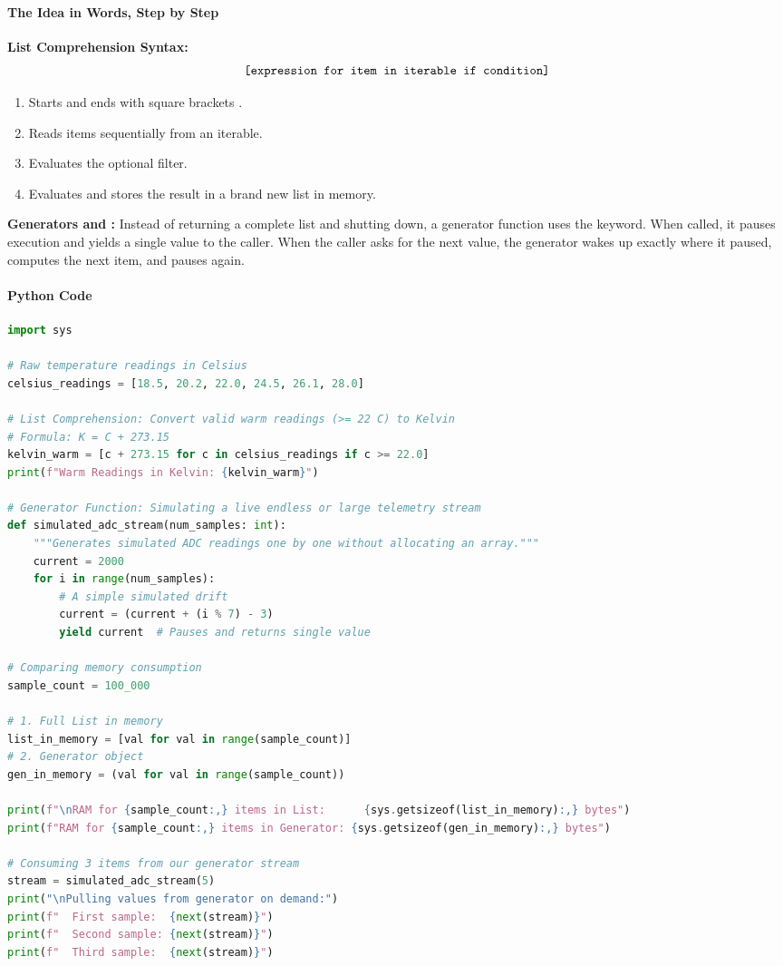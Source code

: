 \paragraph{The Idea in Words, Step by Step}
\textbf{List Comprehension Syntax:}
\begin{equation}
\code{[expression for item in iterable if condition]}
\end{equation}
\begin{enumerate}
    \item Starts and ends with square brackets \code{[]}.
    \item Reads items sequentially from an iterable.
    \item Evaluates the optional  filter.
    \item Evaluates  and stores the result in a brand new list in memory.
\end{enumerate}

\textbf{Generators and :}
Instead of returning a complete list and shutting down, a generator function uses the  keyword. When called, it pauses execution and yields a single value to the caller. When the caller asks for the next value, the generator wakes up exactly where it paused, computes the next item, and pauses again.

\paragraph{Python Code}
\begin{lstlisting}[language=Python]
import sys

# Raw temperature readings in Celsius
celsius_readings = [18.5, 20.2, 22.0, 24.5, 26.1, 28.0]

# List Comprehension: Convert valid warm readings (>= 22 C) to Kelvin
# Formula: K = C + 273.15
kelvin_warm = [c + 273.15 for c in celsius_readings if c >= 22.0]
print(f"Warm Readings in Kelvin: {kelvin_warm}")

# Generator Function: Simulating a live endless or large telemetry stream
def simulated_adc_stream(num_samples: int):
    """Generates simulated ADC readings one by one without allocating an array."""
    current = 2000
    for i in range(num_samples):
        # A simple simulated drift
        current = (current + (i % 7) - 3)
        yield current  # Pauses and returns single value

# Comparing memory consumption
sample_count = 100_000

# 1. Full List in memory
list_in_memory = [val for val in range(sample_count)]
# 2. Generator object
gen_in_memory = (val for val in range(sample_count))

print(f"\nRAM for {sample_count:,} items in List:      {sys.getsizeof(list_in_memory):,} bytes")
print(f"RAM for {sample_count:,} items in Generator: {sys.getsizeof(gen_in_memory):,} bytes")

# Consuming 3 items from our generator stream
stream = simulated_adc_stream(5)
print("\nPulling values from generator on demand:")
print(f"  First sample:  {next(stream)}")
print(f"  Second sample: {next(stream)}")
print(f"  Third sample:  {next(stream)}")
\end{lstlisting}

